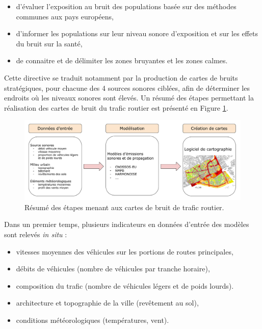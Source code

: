\begin{itemize}
	\item d'évaluer l'exposition au bruit des populations basée sur des méthodes communes aux pays européens,
	\item d'informer les populations sur leur niveau sonore d'exposition et sur les effets du bruit sur la santé,
	\item de connaitre et de délimiter les zones bruyantes et les zones calmes.\\
\end{itemize}

Cette directive se traduit notamment par la production de cartes de bruits stratégiques, pour chacune des 4 sources sonores ciblées, afin de déterminer les endroits où les niveaux sonores sont élevés. Un résumé des étapes permettant la réalisation des cartes de bruit du trafic routier est présenté en Figure \ref{fig:cartographie}.\\


\begin{figure}[h]
\centering
\includegraphics[width=.85\linewidth]{./figures/cartographie/cartographie.pdf}
\caption{Résumé des étapes menant aux cartes de bruit de trafic routier.}
\label{fig:cartographie}
\end{figure}

Dans un premier temps, plusieurs indicateurs en données d'entrée des modèles sont relevés \textit{in situ} :  

\begin{itemize}
\item vitesses moyennes des véhicules sur les portions de routes principales,
\item débits de véhicules (nombre de véhicules par tranche horaire),
\item composition du trafic (nombre de véhicules légers et de poids lourds).
\item architecture et topographie de la ville (revêtement au sol), 
\item conditions météorologiques (températures, vent).\\
\end{itemize}

